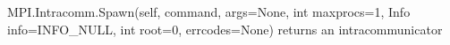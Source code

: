 MPI.Intracomm.Spawn(self,
    command, args=None, int maxprocs=1, Info info=INFO_NULL,
    int root=0, errcodes=None)
returns an intracommunicator
    
